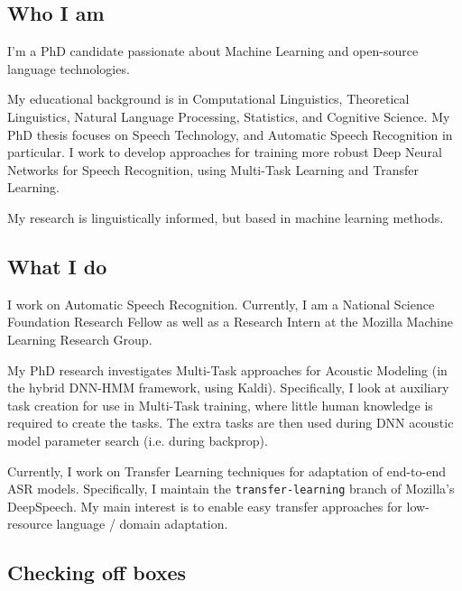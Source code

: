 \documentclass[12pt,a4paper]{article}
\begin{document}
\subsection*{Who I am}

I’m a PhD candidate passionate about Machine Learning and open-source language technologies.

My educational background is in Computational Linguistics, Theoretical Linguistics, Natural Language Processing, Statistics, and Cognitive Science. My PhD thesis focuses on Speech Technology, and Automatic Speech Recognition in particular. I work to develop approaches for training more robust Deep Neural Networks for Speech Recognition, using Multi-Task Learning and Transfer Learning.

My research is linguistically informed, but based in machine learning methods.


\subsection*{What I do}

I work on Automatic Speech Recognition. Currently, I am a National Science Foundation Research Fellow as well as a Research Intern at the Mozilla Machine Learning Research Group.

My PhD research investigates Multi-Task approaches for Acoustic Modeling (in the hybrid DNN-HMM framework, using Kaldi). Specifically, I look at auxiliary task creation for use in Multi-Task training, where little human knowledge is required to create the tasks. The extra tasks are then used during DNN acoustic model parameter search (i.e. during backprop).

Currently, I work on Transfer Learning techniques for adaptation of end-to-end ASR models. Specifically, I maintain the \texttt{transfer-learning} branch of Mozilla's DeepSpeech. My main interest is to enable easy transfer approaches for low-resource language / domain adaptation.


\subsection*{Checking off boxes}
\end{document}
